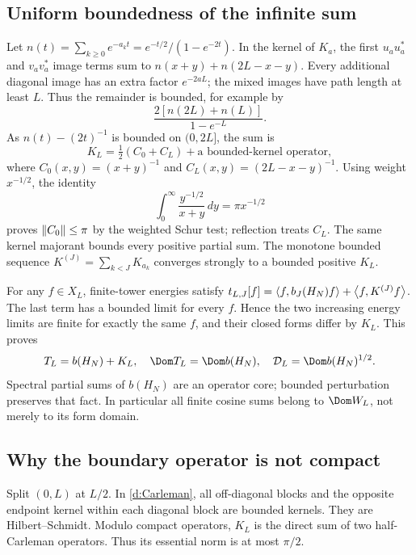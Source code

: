 \subsection{Uniform boundedness of the infinite sum}
Let $n(t)=\sum_{k\ge0}e^{-a_kt}=e^{-t/2}/(1-e^{-2t})$. In the kernel
of $K_a$, the first $u_au_a^*$ and $v_av_a^*$ image terms sum to
$n(x+y)+n(2L-x-y)$. Every additional diagonal image has an extra
factor $e^{-2aL}$; the mixed images have path length at least $L$.
Thus the remainder is bounded, for example by
\[
\frac{2[n(2L)+n(L)]}{1-e^{-L}}.
\]
As $n(t)-(2t)^{-1}$ is bounded on $(0,2L]$, the sum is
\begin{equation}\label{d:Carleman}
K_L=\tfrac12(C_0+C_L)+\text{a bounded-kernel operator},
\end{equation}
where $C_0(x,y)=(x+y)^{-1}$ and $C_L(x,y)=(2L-x-y)^{-1}$.
Using weight $x^{-1/2}$, the identity
\[
\int_0^\infty\frac{y^{-1/2}}{x+y}\,dy=\pi x^{-1/2}
\]
proves $\left\lVert C_0\right\rVert\le\pi$ by the weighted Schur test; reflection treats
$C_L$. The same kernel majorant bounds every positive partial sum.
The monotone bounded sequence $K^{(J)}=\sum_{k<J}K_{a_k}$ converges strongly
to a bounded positive $K_L$.

For any $f\in X_L$, finite-tower energies satisfy
$t_{L,J}[f]=\left\langle f,b_J(H_N)f\right\rangle+\left\langle f,K^{(J)}f\right\rangle$.
The last term has a bounded limit for every $f$. Hence the two increasing
energy limits are finite for exactly the same $f$, and their closed forms
differ by $K_L$. This proves
\begin{equation}\label{d:domains}
T_L=b(H_N)+K_L,\quad\Dom T_L=\Dom b(H_N),\quad
\mathcal D_L=\Dom b(H_N)^{1/2}.
\end{equation}
Spectral partial sums of $b(H_N)$ are an operator core; bounded perturbation
preserves that fact. In particular all finite cosine sums belong to
$\Dom W_L$, not merely to its form domain.

\subsection{Why the boundary operator is not compact}
Split $(0,L)$ at $L/2$. In \eqref{d:Carleman}, all off-diagonal blocks and
the opposite endpoint kernel within each diagonal block are bounded kernels.
They are Hilbert--Schmidt. Modulo compact operators, $K_L$ is the direct
sum of two half-Carleman operators. Thus its essential norm is at most
$\pi/2$.

